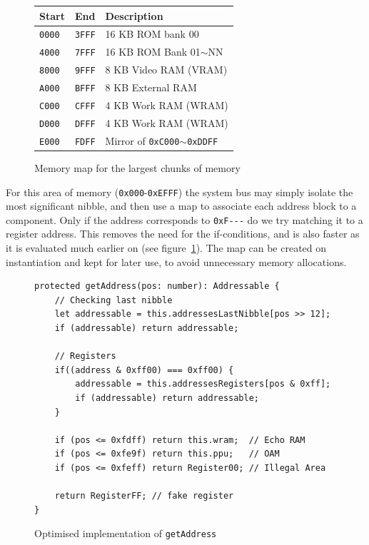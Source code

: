 \documentclass[11pt]{report}
\begin{document}
\begin{figure}[h]
    \centering
    \begin{tabular}{|l|l|l|}
    \hline
    \textbf{Start} & \textbf{End} & \textbf{Description} \\ \hline
    \texttt{0000} & \texttt{3FFF} & 16 KB ROM bank 00 \\ \hline
    \texttt{4000} & \texttt{7FFF} & 16 KB ROM Bank 01$\sim$NN \\ \hline
    \texttt{8000} & \texttt{9FFF} & 8 KB Video RAM (VRAM) \\ \hline
    \texttt{A000} & \texttt{BFFF} & 8 KB External RAM \\ \hline
    \texttt{C000} & \texttt{CFFF} & 4 KB Work RAM (WRAM) \\ \hline
    \texttt{D000} & \texttt{DFFF} & 4 KB Work RAM (WRAM) \\ \hline
    \texttt{E000} & \texttt{FDFF} & Mirror of \texttt{0xC000}$\sim$\texttt{0xDDFF} \\ \hline
    \end{tabular}
    \caption{Memory map for the largest chunks of memory \cite{memorymap}}
\end{figure}

For this area of memory (\texttt{0x000}-\texttt{0xEFFF}) the system bus may simply isolate the most significant nibble, and then use a map to associate each address block to a component. Only if the address corresponds to \texttt{0xF-{}-{}-} do we try matching it to a register address. This removes the need for the if-conditions, and is also faster as it is evaluated much earlier on (see figure~\ref{fig:getaddress-after}). The map can be created on instantiation and kept for later use, to avoid unnecessary memory allocations.

\begin{figure}[h]
    \begin{verbatim}
protected getAddress(pos: number): Addressable {
    // Checking last nibble
    let addressable = this.addressesLastNibble[pos >> 12];
    if (addressable) return addressable;

    // Registers
    if((address & 0xff00) === 0xff00) {
        addressable = this.addressesRegisters[pos & 0xff];
        if (addressable) return addressable;
    }

    if (pos <= 0xfdff) return this.wram;  // Echo RAM
    if (pos <= 0xfe9f) return this.ppu;   // OAM
    if (pos <= 0xfeff) return Register00; // Illegal Area

    return RegisterFF; // fake register
}
    \end{verbatim}
    \caption{Optimised implementation of \texttt{getAddress}}
    \label{fig:getaddress-after}
\end{figure}
\end{document}
